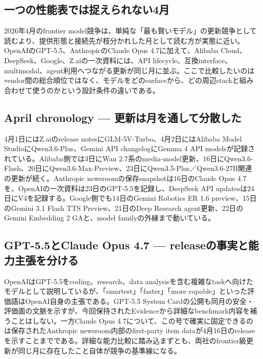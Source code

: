 \begingroup\raggedright
\subsection{一つの性能表では捉えられない4月}
\par\endgroup

2026年4月のfrontier model競争は、単純な「最も賢いモデル」の更新競争として読むより、提供形態と接続先が枝分かれした月として読む方が実態に近い。OpenAIのGPT-5.5、AnthropicのClaude Opus 4.7に加えて、Alibaba Cloud、DeepSeek、Google、Z.aiの一次資料には、API lifecycle、互換interface、multimodal、agent利用へつながる更新が同じ月に並ぶ。ここで比較したいのはvendor間の総合順位ではなく、モデルをどのsurfaceから、どの周辺stackと組み合わせて使うのかという設計条件の違いである。\autocite{src-9156c37fb1c2,src-a24fd97eb3d0,src-dfe7e0c6ff39,src-e547d0d8cbe3,src-eac8dfbeb78c,src-f6aa679babd7}


\begingroup\raggedright
\subsection{April chronology — 更新は月を通して分散した}
\par\endgroup

4月1日にはZ.aiのrelease notesにGLM-5V-Turbo、4月2日にはAlibaba Model StudioにQwen3.6-Plus、Gemini API changelogにGemma 4 API modelsが記録されている。Alibaba側では3日にWan 2.7系のmedia-model更新、16日にQwen3.6-Flash、20日にQwen3.6-Max-Preview、23日にQwen3.5-Plus／Qwen3.6-27B関連の更新が続く。Anthropic newsroomの保存snapshotは16日のClaude Opus 4.7を、OpenAIの一次資料は23日のGPT-5.5を記録し、DeepSeek API updatesは24日にV4を記録する。Google側でも14日のGemini Robotics ER 1.6 preview、15日のGemini 3.1 Flash TTS Preview、21日のDeep Research agent更新、22日のGemini Embedding 2 GAと、model familyの外縁まで動いている。\autocite{src-9156c37fb1c2,src-a24fd97eb3d0,src-dfe7e0c6ff39,src-e547d0d8cbe3,src-eac8dfbeb78c,src-f6aa679babd7}


\begingroup\raggedright
\subsection{GPT-5.5とClaude Opus 4.7 — releaseの事実と能力主張を分ける}
\par\endgroup

OpenAIはGPT-5.5をcoding、research、data analysisを含む複雑なtaskへ向けたモデルとして説明しているが、「smartest」「faster」「more capable」といった評価語はOpenAI自身の主張である。GPT-5.5 System Cardの公開も同月の安全・評価面の文脈を示すが、今回保持されたEvidenceから詳細なbenchmark内容を補うことはしない。一方Claude Opus 4.7について、この号で確実に固定できるのは保存されたAnthropic newsroom内部のfirst-party item dataが4月16日のreleaseを示すことまでである。詳細な能力比較に踏み込まずとも、両社のfrontier級更新が同じ月に存在したこと自体が競争の基準線になる。\autocite{src-a07eb39dec04,src-dfe7e0c6ff39,src-f6aa679babd7}


